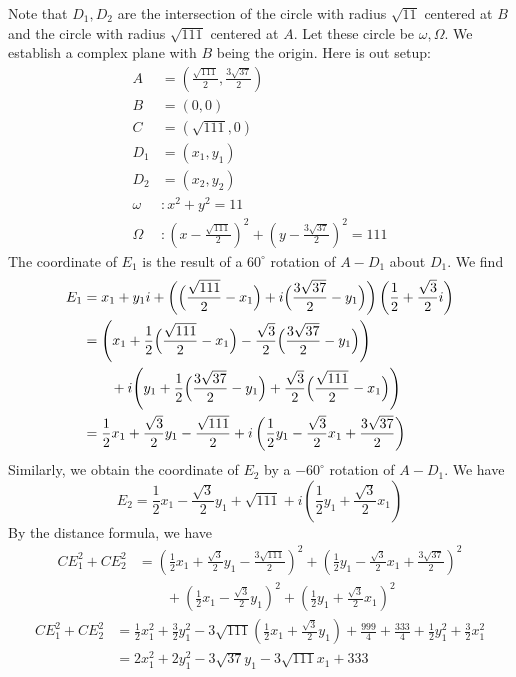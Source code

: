 \begin{enumerate}
Note that $D_1,D_2$ are the intersection of the circle with radius $\sqrt{11}$ centered at $B$ and the circle with radius $\sqrt{111}$ centered at $A$. Let these circle be $\omega, \Omega$. We establish a complex plane with $B$ being the origin. Here is out setup:\begin{align*}A&=\left(\frac{\sqrt{111}}{2},\frac{3\sqrt{37}}{2}\right)\\B&=(0,0)\\C&=(\sqrt{111},0)\\D_1&=(x_1,y_1)\\D_2&=(x_2,y_2)\\\omega &: x^2+y^2=11\\\Omega &: \left(x-\frac{\sqrt{111}}{2}\right)^2+\left(y-\frac{3\sqrt{37}}{2}\right)^2=111\end{align*}
The coordinate of $E_1$ is the result of a $60^\circ$ rotation of $A-D_1$ about $D_1$. We find\begin{align*}E_1&=x_1+y_1i+\left(\Bigl(\frac{\sqrt{111}}{2}-x_1\Bigr)+i\Bigl(\frac{3\sqrt{37}}{2}-y_1\Bigr)\right)\left(\frac{1}{2}+\frac{\sqrt{3}}{2}i\right)\\&=\Biggl(x_1+\frac{1}{2}\Bigl(\frac{\sqrt{111}}{2}-x_1\Bigr)-\frac{\sqrt{3}}{2}\Bigl(\frac{3\sqrt{37}}{2}-y_1\Bigr)\Biggr) \\&\qquad +i\Biggl(y_1+\frac{1}{2}\Bigl(\frac{3\sqrt{37}}{2}-y_1\Bigr)+\frac{\sqrt{3}}{2}\Bigl(\frac{\sqrt{111}}{2}-x_1\Bigr)\Biggr) \\&=\frac{1}{2}x_1+\frac{\sqrt{3}}{2}y_1-\frac{\sqrt{111}}{2}+i\left(\frac{1}{2}y_1-\frac{\sqrt{3}}{2}x_1+\frac{3\sqrt{37}}{2}\right)\end{align*}
Similarly, we obtain the coordinate of $E_2$ by a $-60^\circ$ rotation of $A-D_1$. We have
 \[E_2=\frac{1}{2}x_1-\frac{\sqrt{3}}{2}y_1+\sqrt{111}+i\left(\frac{1}{2}y_1+\frac{\sqrt{3}}{2}x_1\right)\]By the distance formula, we have\begin{align*}CE_1^2+CE_2^2&=\left(\frac{1}{2}x_1+\frac{\sqrt{3}}{2}y_1-\frac{3\sqrt{111}}{2}\right)^2+\left(\frac{1}{2}y_1-\frac{\sqrt{3}}{2}x_1+\frac{3\sqrt{37}}{2}\right)^2\\&\qquad+\left(\frac{1}{2}x_1-\frac{\sqrt{3}}{2}y_1\right)^2+\left(\frac{1}{2}y_1+\frac{\sqrt{3}}{2}x_1\right)^2\end{align*}
\begin{align*}CE_1^2+CE_2^2&=\frac{1}{2}x_1^2+\frac{3}{2}y_1^2-3\sqrt{111}\left(\frac{1}{2}x_1+\frac{\sqrt{3}}{2}y_1\right)+\frac{999}{4}+\frac{333}{4}+\frac{1}{2}y_1^2+\frac{3}{2}x_1^2\\&=2x_1^2+2y_1^2-3\sqrt{37}y_1-3\sqrt{111}x_1+333\end{align*}

\end{enumerate}

